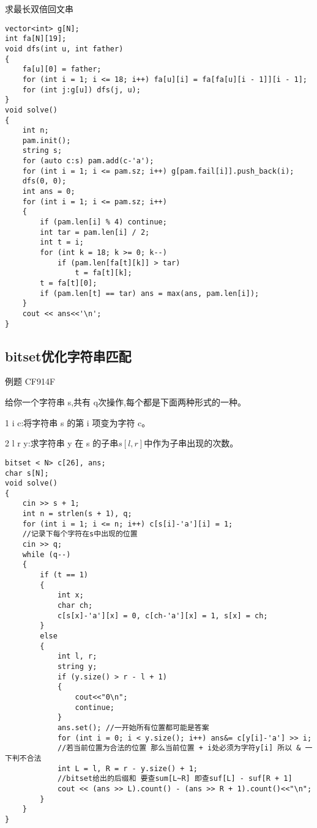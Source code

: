 \documentclass[a4paper,fontset=none]{ctexart}
\begin{document}
求最长双倍回文串

\begin{verbatim}
vector<int> g[N];
int fa[N][19];
void dfs(int u, int father)
{
    fa[u][0] = father;
    for (int i = 1; i <= 18; i++) fa[u][i] = fa[fa[u][i - 1]][i - 1];
    for (int j:g[u]) dfs(j, u);
}
void solve()
{
    int n;
    pam.init();
    string s;
    for (auto c:s) pam.add(c-'a');
    for (int i = 1; i <= pam.sz; i++) g[pam.fail[i]].push_back(i);
    dfs(0, 0);
    int ans = 0;
    for (int i = 1; i <= pam.sz; i++)
    {
        if (pam.len[i] % 4) continue;
        int tar = pam.len[i] / 2;
        int t = i;
        for (int k = 18; k >= 0; k--)
            if (pam.len[fa[t][k]] > tar)
                t = fa[t][k];
        t = fa[t][0];
        if (pam.len[t] == tar) ans = max(ans, pam.len[i]);
    }
    cout << ans<<'\n';
}
\end{verbatim}
\subsection{bitset优化字符串匹配}

例题 CF914F

给你一个字符串 s,共有 q次操作,每个都是下面两种形式的一种。

1 i c:将字符串 s 的第 i 项变为字符 c。

2 l r y:求字符串 y 在 s 的子串$s [l , r]$中作为子串出现的次数。

\begin{verbatim}
bitset < N> c[26], ans;
char s[N];
void solve()
{
    cin >> s + 1;
    int n = strlen(s + 1), q;
    for (int i = 1; i <= n; i++) c[s[i]-'a'][i] = 1;
    //记录下每个字符在s中出现的位置
    cin >> q;
    while (q--)
    {
        if (t == 1)
        {
            int x;
            char ch;
            c[s[x]-'a'][x] = 0, c[ch-'a'][x] = 1, s[x] = ch;
        }
        else
        {
            int l, r;
            string y;
            if (y.size() > r - l + 1)
            {
                cout<<"0\n";
                continue;
            }
            ans.set(); //一开始所有位置都可能是答案
            for (int i = 0; i < y.size(); i++) ans&= c[y[i]-'a'] >> i;
            //若当前位置为合法的位置 那么当前位置 + i处必须为字符y[i] 所以 & 一下判不合法
            int L = l, R = r - y.size() + 1;
            //bitset给出的后缀和 要查sum[L~R] 即查suf[L] - suf[R + 1]
            cout << (ans >> L).count() - (ans >> R + 1).count()<<"\n";
        }
    }
}
\end{verbatim}
\end{document}
